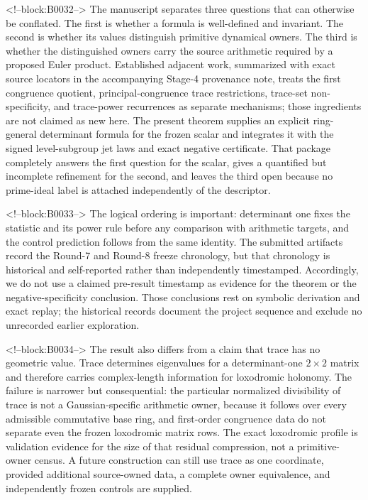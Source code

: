 \documentclass[11pt,a4paper]{article}
\theoremstyle{definition}
\theoremstyle{remark}
\begin{document}
<!--block:B0032-->
The manuscript separates three questions that can otherwise be conflated. The first is whether a formula is well-defined and invariant. The second is whether its values distinguish primitive dynamical owners. The third is whether the distinguished owners carry the source arithmetic required by a proposed Euler product. Established adjacent work, summarized with exact source locators in the accompanying Stage-4 provenance note, treats the first congruence quotient, principal-congruence trace restrictions, trace-set non-specificity, and trace-power recurrences as separate mechanisms; those ingredients are not claimed as new here. The present theorem supplies an explicit ring-general determinant formula for the frozen scalar and integrates it with the signed level-subgroup jet laws and exact negative certificate. That package completely answers the first question for the scalar, gives a quantified but incomplete refinement for the second, and leaves the third open because no prime-ideal label is attached independently of the descriptor.

<!--block:B0033-->
The logical ordering is important: determinant one fixes the statistic and its power rule before any comparison with arithmetic targets, and the control prediction follows from the same identity. The submitted artifacts record the Round-7 and Round-8 freeze chronology, but that chronology is historical and self-reported rather than independently timestamped. Accordingly, we do not use a claimed pre-result timestamp as evidence for the theorem or the negative-specificity conclusion. Those conclusions rest on symbolic derivation and exact replay; the historical records document the project sequence and exclude no unrecorded earlier exploration.

<!--block:B0034-->
The result also differs from a claim that trace has no geometric value. Trace determines eigenvalues for a determinant-one \(2\times2\) matrix and therefore carries complex-length information for loxodromic holonomy. The failure is narrower but consequential: the particular normalized divisibility of trace is not a Gaussian-specific arithmetic owner, because it follows over every admissible commutative base ring, and first-order congruence data do not separate even the frozen loxodromic matrix rows. The exact loxodromic profile is validation evidence for the size of that residual compression, not a primitive-owner census. A future construction can still use trace as one coordinate, provided additional source-owned data, a complete owner equivalence, and independently frozen controls are supplied.
\end{document}
